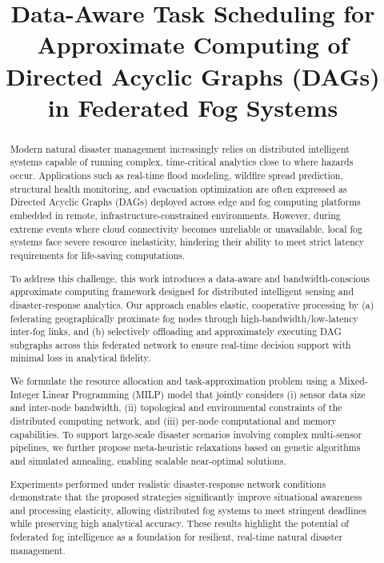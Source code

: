 \documentclass[conference]{IEEEtran}
\title{Data-Aware Task Scheduling for Approximate Computing of Directed Acyclic Graphs (DAGs) in Federated Fog Systems }
\author{}
\date{}
\begin{document}
\maketitle

\begin{abstract}
Modern natural disaster management increasingly relies on distributed intelligent systems capable of running complex, time-critical analytics close to where hazards occur. Applications such as real-time flood modeling, wildfire spread prediction, structural health monitoring, and evacuation optimization are often expressed as Directed Acyclic Graphs (DAGs) deployed across edge and fog computing platforms embedded in remote, infrastructure-constrained environments. However, during extreme events where cloud connectivity becomes unreliable or unavailable, local fog systems face severe resource inelasticity, hindering their ability to meet strict latency requirements for life-saving computations.

To address this challenge, this work introduces a data-aware and bandwidth-conscious approximate computing framework designed for distributed intelligent sensing and disaster-response analytics. Our approach enables elastic, cooperative processing by (a) federating geographically proximate fog nodes through high-bandwidth/low-latency inter-fog links, and (b) selectively offloading and approximately executing DAG subgraphs across this federated network to ensure real-time decision support with minimal loss in analytical fidelity.

We formulate the resource allocation and task-approximation problem using a Mixed-Integer Linear Programming (MILP) model that jointly considers (i) sensor data size and inter-node bandwidth, (ii) topological and environmental constraints of the distributed computing network, and (iii) per-node computational and memory capabilities. To support large-scale disaster scenarios involving complex multi-sensor pipelines, we further propose meta-heuristic relaxations based on genetic algorithms and simulated annealing, enabling scalable near-optimal solutions.

Experiments performed under realistic disaster-response network conditions demonstrate that the proposed strategies significantly improve situational awareness and processing elasticity, allowing distributed fog systems to meet stringent deadlines while preserving high analytical accuracy. These results highlight the potential of federated fog intelligence as a foundation for resilient, real-time natural disaster management.


\end{abstract}
\end{document}
